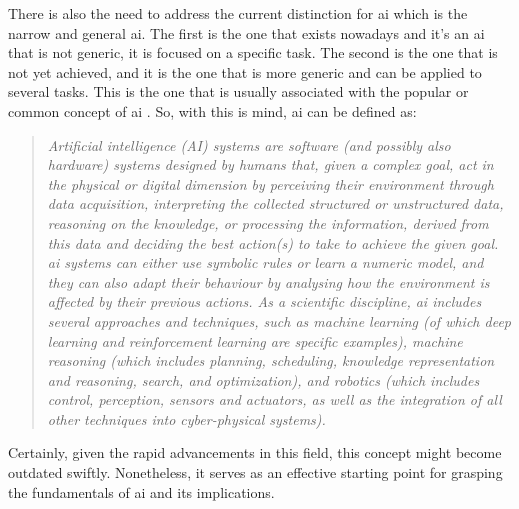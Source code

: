 There is also the need to address the current distinction for \ac{ai} which is the narrow and general \ac{ai}. The first is the one that exists nowadays and it's an \ac{ai} that is not generic, it is focused on a specific task. The second is the one that is not yet achieved, and it is the one that is more generic and can be applied to several tasks. This is the one that is usually associated with the popular or common concept of \ac{ai} \cite{DefinitionAIMain2019,DBLP:books/aw/RN2020}. So, with this is mind, \ac{ai} can be defined as:
\begin{quote}
    \textit{Artificial intelligence (AI) systems are software (and possibly also hardware) systems designed by humans that, given a complex goal, act in the physical or digital dimension by perceiving their environment through data acquisition, interpreting the collected structured or unstructured data, reasoning on the knowledge, or processing the information, derived from this data and deciding the best action(s) to take to achieve the given goal. \ac{ai} systems can either use symbolic rules or learn a numeric model, and they can also adapt their behaviour by analysing how the environment is affected by their previous actions. As a scientific discipline, \ac{ai} includes several approaches and techniques, such as machine learning (of which deep learning and reinforcement learning are specific examples), machine reasoning (which includes planning, scheduling, knowledge representation and reasoning, search, and optimization), and robotics (which includes control, perception, sensors and actuators, as well as the integration of all other techniques into cyber-physical systems).} \cite{DefinitionAIMain2019}
    \end{quote}
    
Certainly, given the rapid advancements in this field, this concept might become outdated swiftly. Nonetheless, it serves as an effective starting point for grasping the fundamentals of \ac{ai} and its implications.



